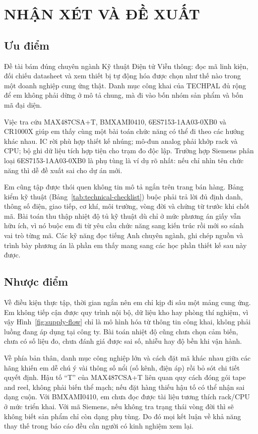 \chapter{NHẬN XÉT VÀ ĐỀ XUẤT}

\section{Ưu điểm}

Đề tài bám đúng chuyên ngành Kỹ thuật Điện tử Viễn thông: đọc mã linh kiện, đối
chiếu datasheet và xem thiết bị tự động hóa được chọn như thế nào trong một
doanh nghiệp cung ứng thật. Danh mục công khai của TECHPAL đủ rộng để em không
phải dừng ở mô tả chung, mà đi vào bốn nhóm sản phẩm và bốn mã đại diện.

Việc tra cứu MAX487CSA+T, BMXAMI0410, 6ES7153-1AA03-0XB0 và CR1000X giúp em
thấy cùng một bài toán chức năng có thể đi theo các hướng khác nhau. IC rời
phù hợp thiết kế nhúng; mô-đun analog phải khớp rack và CPU; bộ ghi dữ liệu
tích hợp tiện cho trạm đo độc lập. Trường hợp Siemens phân loại
6ES7153-1AA03-0XB0 là phụ tùng là ví dụ rõ nhất: nếu chỉ nhìn tên chức năng
thì dễ đề xuất sai cho dự án mới.

Em cũng tập được thói quen không tin mô tả ngắn trên trang bán hàng. Bảng kiểm
kỹ thuật (Bảng~\ref{tab:technical-checklist}) buộc phải trả lời đủ định danh,
thông số điện, giao tiếp, cơ khí, môi trường, vòng đời và chứng từ trước khi
chốt mã. Bài toán thu thập nhiệt độ tủ kỹ thuật dù chỉ ở mức phương án giấy
vẫn hữu ích, vì nó buộc em đi từ yêu cầu chức năng sang kiến trúc rồi mới so
sánh vai trò từng mã. Các kỹ năng đọc tiếng Anh chuyên ngành, ghi chép nguồn
và trình bày phương án là phần em thấy mang sang các học phần thiết kế sau này
được.

\section{Nhược điểm}

Về điều kiện thực tập, thời gian ngắn nên em chỉ kịp đi sâu một mảng cung ứng.
Em không tiếp cận được quy trình nội bộ, dữ liệu kho hay phòng thí nghiệm, vì
vậy Hình~\ref{fig:supply-flow} chỉ là mô hình hóa từ thông tin công khai, không
phải luồng đang áp dụng tại công ty. Bài toán nhiệt độ cũng chưa chọn cảm biến,
chưa có số liệu đo, chưa đánh giá được sai số, nhiễu hay độ bền khi vận hành.

Về phía bản thân, danh mục công nghiệp lớn và cách đặt mã khác nhau giữa các
hãng khiến em dễ chú ý vài thông số nổi (số kênh, điện áp) rồi bỏ sót chi tiết
quyết định. Hậu tố ``T'' của MAX487CSA+T liên quan quy cách đóng gói tape and
reel, không phải biến thể mạch; nếu đặt hàng thiếu hậu tố có thể nhận sai dạng
cuộn. Với BMXAMI0410, em chưa đọc được tài liệu tương thích rack/CPU ở mức
triển khai. Với mã Siemens, nếu không tra trạng thái vòng đời thì sẽ không biết
sản phẩm chỉ còn dạng phụ tùng. Do đó mọi kết luận về khả năng thay thế trong
báo cáo đều cần người có kinh nghiệm xem lại.

